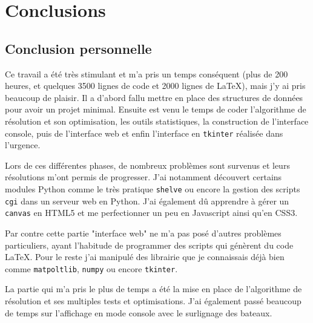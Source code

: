 \chapter{Conclusions}
\section{Conclusion personnelle}
Ce travail a été très stimulant et m'a pris un temps conséquent (plus de 200 heures, et quelques 3500 lignes de code et 2000 lignes de \LaTeX), mais j'y ai pris beaucoup de plaisir. Il a d'abord fallu mettre en place des structures de données pour avoir un projet minimal. Ensuite est venu le temps de coder l'algorithme de résolution et son optimisation, les outils statistiques, la construction de l'interface console, puis de l'interface web et enfin l'interface en \texttt{tkinter} réalisée dans l'urgence. 

Lors de ces différentes phases, de nombreux problèmes sont survenus et leurs résolutions m'ont permis de progresser. J'ai notamment découvert certains modules Python comme le très pratique \texttt{shelve} ou encore la gestion des scripts \texttt{cgi} dans un serveur web en Python. J'ai également dû apprendre à gérer un \texttt{canvas} en HTML5 et me perfectionner un peu en Javascript ainsi qu'en CSS3. 

Par contre cette partie "interface web" ne m'a pas posé d'autres problèmes particuliers, ayant l'habitude de programmer des scripts qui génèrent du code \LaTeX. Pour le reste j'ai manipulé des librairie que je connaissais déjà bien comme \texttt{matpoltlib}, \texttt{numpy} ou encore \texttt{tkinter}. 

La partie qui m'a pris le plus de temps a été la mise en place de l'algorithme de résolution et ses multiples tests et optimisations. J'ai également passé beaucoup de temps sur l'affichage en mode console avec le surlignage des bateaux.

%

